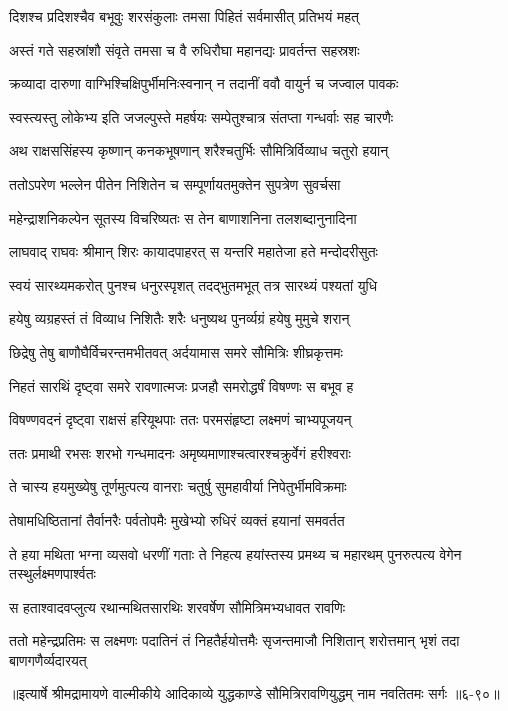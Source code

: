 \twolineshloka
{दिशश्च प्रदिशश्चैव बभूवुः शरसंकुलाः}
{तमसा पिहितं सर्वमासीत् प्रतिभयं महत्} %

\twolineshloka
{अस्तं गते सहस्रांशौ संवृते तमसा च वै}
{रुधिरौघा महानद्यः प्रावर्तन्त सहस्रशः} %

\twolineshloka
{क्रव्यादा दारुणा वाग्भिश्चिक्षिपुर्भीमनिःस्वनान्}
{न तदानीं ववौ वायुर्न च जज्वाल पावकः} %

\twolineshloka
{स्वस्त्यस्तु लोकेभ्य इति जजल्पुस्ते महर्षयः}
{सम्पेतुश्चात्र संतप्ता गन्धर्वाः सह चारणैः} %

\twolineshloka
{अथ राक्षससिंहस्य कृष्णान् कनकभूषणान्}
{शरैश्चतुर्भिः सौमित्रिर्विव्याध चतुरो हयान्} %

\twolineshloka
{ततोऽपरेण भल्लेन पीतेन निशितेन च}
{सम्पूर्णायतमुक्तेन सुपत्रेण सुवर्चसा} %

\twolineshloka
{महेन्द्राशनिकल्पेन सूतस्य विचरिष्यतः}
{स तेन बाणाशनिना तलशब्दानुनादिना} %

\twolineshloka
{लाघवाद् राघवः श्रीमान् शिरः कायादपाहरत्}
{स यन्तरि महातेजा हते मन्दोदरीसुतः} %

\twolineshloka
{स्वयं सारथ्यमकरोत् पुनश्च धनुरस्पृशत्}
{तदद्भुतमभूत् तत्र सारथ्यं पश्यतां युधि} %

\twolineshloka
{हयेषु व्यग्रहस्तं तं विव्याध निशितैः शरैः}
{धनुष्यथ पुनर्व्यग्रं हयेषु मुमुचे शरान्} %

\twolineshloka
{छिद्रेषु तेषु बाणौघैर्विचरन्तमभीतवत्}
{अर्दयामास समरे सौमित्रिः शीघ्रकृत्तमः} %

\twolineshloka
{निहतं सारथिं दृष्ट्वा समरे रावणात्मजः}
{प्रजहौ समरोद्धर्षं विषण्णः स बभूव ह} %

\twolineshloka
{विषण्णवदनं दृष्ट्वा राक्षसं हरियूथपाः}
{ततः परमसंहृष्टा लक्ष्मणं चाभ्यपूजयन्} %

\twolineshloka
{ततः प्रमाथी रभसः शरभो गन्धमादनः}
{अमृष्यमाणाश्चत्वारश्चक्रुर्वेगं हरीश्वराः} %

\twolineshloka
{ते चास्य हयमुख्येषु तूर्णमुत्पत्य वानराः}
{चतुर्षु सुमहावीर्या निपेतुर्भीमविक्रमाः} %

\twolineshloka
{तेषामधिष्ठितानां तैर्वानरैः पर्वतोपमैः}
{मुखेभ्यो रुधिरं व्यक्तं हयानां समवर्तत} %

\threelineshloka
{ते हया मथिता भग्ना व्यसवो धरणीं गताः}
{ते निहत्य हयांस्तस्य प्रमथ्य च महारथम्}
{पुनरुत्पत्य वेगेन तस्थुर्लक्ष्मणपार्श्वतः} %

\twolineshloka
{स हताश्वादवप्लुत्य रथान्मथितसारथिः}
{शरवर्षेण सौमित्रिमभ्यधावत रावणिः} %

\twolineshloka
{ततो महेन्द्रप्रतिमः स लक्ष्मणः पदातिनं तं निहतैर्हयोत्तमैः}
{सृजन्तमाजौ निशितान् शरोत्तमान् भृशं तदा बाणगणैर्व्यदारयत्} %


॥इत्यार्षे श्रीमद्रामायणे वाल्मीकीये आदिकाव्ये युद्धकाण्डे सौमित्रिरावणियुद्धम् नाम नवतितमः सर्गः ॥६-९०॥
